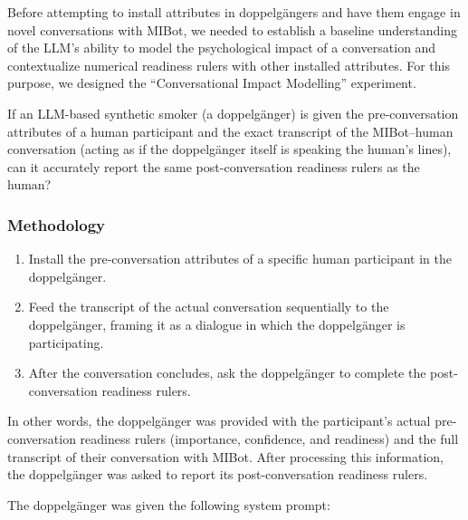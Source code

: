 Before attempting to install attributes in doppelgängers and have them engage in novel
conversations with MIBot, we needed to establish a baseline understanding of the LLM's
ability to model the psychological impact of a conversation and contextualize numerical
readiness rulers with other installed attributes. For this purpose, we designed the
``Conversational Impact Modelling'' experiment.

If an LLM-based synthetic smoker (a doppelgänger) is given the pre-conversation
attributes of a human participant and the exact transcript of the MIBot--human
conversation (acting as if the doppelgänger itself is speaking the human's lines), can
it accurately report the same post-conversation readiness rulers as the human?

\subsubsection{Methodology}
\begin{enumerate}
	\item Install the pre-conversation attributes of a specific human participant in the
	      doppelgänger.
	\item Feed the transcript of the actual conversation sequentially to the doppelgänger,
	      framing it as a dialogue in which the doppelgänger is participating.
	\item After the conversation concludes, ask the doppelgänger to complete the
	      post-conversation readiness rulers.
\end{enumerate}

In other words, the doppelgänger was provided with the participant's actual
pre-conversation readiness rulers (importance, confidence, and readiness) and the full
transcript of their conversation with MIBot. After processing this information, the
doppelgänger was asked to report its post-conversation readiness rulers.

The doppelgänger was given the following system prompt:


